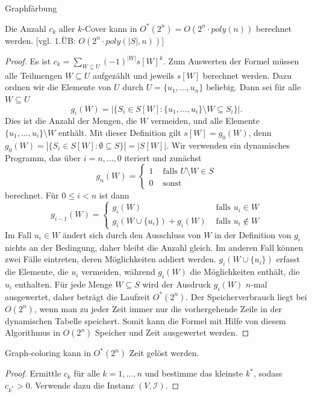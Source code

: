 \begin{section}{Graphfärbung}
  \begin{theorem}
    Die Anzahl \(c_k\) aller \(k\)-Cover kann in \(O^*(2^n) = O(2^n \cdot poly(n))\) berechnet werden. [vgl. 1.ÜB: $O(2^n \cdot poly(|S|,n))$]
  \end{theorem}

  \begin{proof}
    Es ist \(c_k = \sum_{W \subseteq U} (-1)^{ |W| } s[W]^k\). Zum Auswerten der Formel müssen alle Teilmengen \(W \subseteq U\) aufgezählt und jeweils \(s[W]\) berechnet werden. Dazu ordnen wir die Elemente von \(U\) durch \(U = \{u_1,...,u_n\}\) beliebig. Dann sei für alle \(W \subseteq U\)
    \[ g_i(W) = | \{ S_i \in S[W] : \{ u_1, ..., u_i \} \setminus W \subseteq S_i \} |. \]
    Dies ist die Anzahl der Mengen, die \(W\) vermeiden, und alle Elemente \(\{ u_1, ..., u_i \} \setminus W\) enthält.
    Mit dieser Definition gilt \(s[W] = g_0(W)\), denn \(g_0(W) = | \{ S_i \in S[W] : \emptyset \subseteq S \} | = | S[W] |\). Wir verwenden ein dynamisches Programm, das über \(i = n, ..., 0\) iteriert und zunächst
    \[
       g_n(W) =
       \begin{cases}
          1 & \text{ falls }U \setminus W \in S \\
          0 & \text{ sonst}
       \end{cases}
    \]
    berechnet. Für \(0 \leq i < n\) ist dann
    \[
      g_{i-1}(W) =
      \begin{cases}
         g_i(W) & \text{ falls }u_i \in W \\
         g_i(W \cup \{ u_i \}) + g_i(W) & \text{ falls }u_i \notin W
      \end{cases}
    \]
    Im Fall \(u_i \in W\) ändert sich durch den Ausschluss von \(W\) in der Definition von \(g_i\) nichts an der Bedingung, daher bleibt die Anzahl gleich. Im anderen Fall können zwei Fälle eintreten, deren Möglichkeiten addiert werden. \(g_i(W \cup \{ u_i \})\) erfasst die Elemente, die \(u_i\) vermeiden, während \(g_i(W)\) die Möglichkeiten enthält, die \(u_i\) enthalten. Für jede Menge \(W \subseteq S\) wird der Ausdruck \(g_i(W)\) \(n\)-mal ausgewertet, daher beträgt die Laufzeit \(O^*(2^n)\). Der Speicherverbrauch liegt bei \(O(2^n)\), wenn man zu jeder Zeit immer nur die vorhergehende Zeile in der dynamischen Tabelle speichert. Somit kann die Formel mit Hilfe von diesem Algorithmus in \(O(2^n)\) Speicher und Zeit ausgewertet werden.
  \end{proof}
  \begin{corollary}
   Graph-coloring kann in $O^ *(2^n)$ Zeit gelöst werden.
  \end{corollary}
  \begin{proof}
   Ermittle $c_k$ für alle $k = 1, \dots, n$ und bestimme das kleinste $k^*$, sodass $c_{k^*} > 0$. Verwende dazu die Instanz $(V,\mathcal{I})$.
  \end{proof}


\end{section}